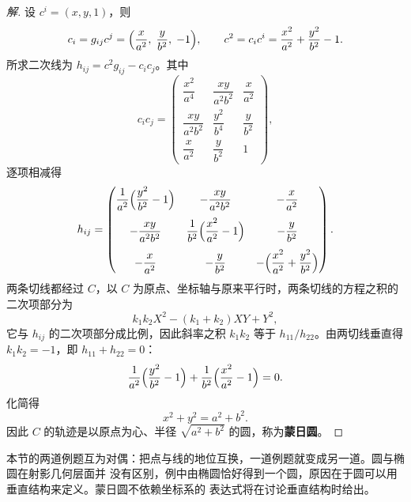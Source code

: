 \begin{proof}[解]
设 $c^i=(x,y,1)$，则
\[
c_i=g_{ij}c^j=\Bigl(\frac{x}{a^2},\;\frac{y}{b^2},\;-1\Bigr),\qquad
c^2=c_ic^i=\frac{x^2}{a^2}+\frac{y^2}{b^2}-1 .
\]
所求二次线为 $h_{ij}=c^2g_{ij}-c_ic_j$。其中
\[
c_ic_j=\begin{pmatrix}
\dfrac{x^2}{a^4} & \dfrac{xy}{a^2b^2} & \dfrac{x}{a^2}\\[8pt]
\dfrac{xy}{a^2b^2} & \dfrac{y^2}{b^4} & \dfrac{y}{b^2}\\[8pt]
\dfrac{x}{a^2} & \dfrac{y}{b^2} & 1
\end{pmatrix},
\]
逐项相减得
\[
h_{ij}=\begin{pmatrix}
\dfrac{1}{a^2}\Bigl(\dfrac{y^2}{b^2}-1\Bigr) & -\dfrac{xy}{a^2b^2} & -\dfrac{x}{a^2}\\[10pt]
-\dfrac{xy}{a^2b^2} & \dfrac{1}{b^2}\Bigl(\dfrac{x^2}{a^2}-1\Bigr) & -\dfrac{y}{b^2}\\[10pt]
-\dfrac{x}{a^2} & -\dfrac{y}{b^2} & -\Bigl(\dfrac{x^2}{a^2}+\dfrac{y^2}{b^2}\Bigr)
\end{pmatrix}.
\]
两条切线都经过 $C$，以 $C$ 为原点、坐标轴与原来平行时，两条切线的方程之积的二次项部分为
\[
k_1k_2X^2-(k_1+k_2)XY+Y^2,
\]
它与 $h_{ij}$ 的二次项部分成比例，因此斜率之积 $k_1k_2$ 等于 $h_{11}/h_{22}$。由两切线垂直得
$k_1k_2=-1$，即 $h_{11}+h_{22}=0$：
\[
\frac{1}{a^2}\Bigl(\frac{y^2}{b^2}-1\Bigr)+\frac{1}{b^2}\Bigl(\frac{x^2}{a^2}-1\Bigr)=0 .
\]
化简得
\[
x^2+y^2=a^2+b^2 .
\]
因此 $C$ 的轨迹是以原点为心、半径 $\sqrt{a^2+b^2}$ 的圆，称为\textbf{蒙日圆}。
\end{proof}

\begin{remark}
本节的两道例题互为对偶：把点与线的地位互换，一道例题就变成另一道。圆与椭圆在射影几何层面并
没有区别，例中由椭圆恰好得到一个圆，原因在于圆可以用垂直结构来定义。蒙日圆不依赖坐标系的
表达式将在讨论垂直结构时给出。
\end{remark}
